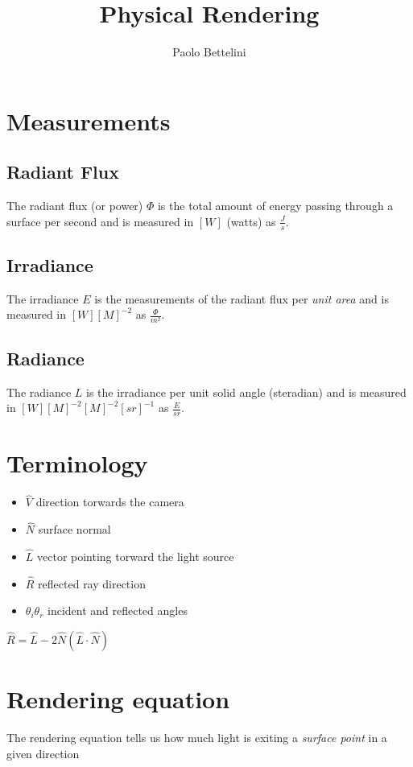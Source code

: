 \documentclass{article}
\title{Physical Rendering}
\author{Paolo Bettelini}
\date{}
\begin{document}
\maketitle
\tableofcontents
\pagebreak

\section{Measurements}

\subsection{Radiant Flux}

The radiant flux (or power) \(\Phi\) is the total amount of energy passing
through a surface per second and is measured in \([W]\) (watts) as \(\frac{J}{s}\).

\subsection{Irradiance}

The irradiance \(E\) is the measurements of the radiant flux per \textit{unit area}
and is measured in \([W]{[M]}^{-2}\) as \(\frac{\Phi}{m^2}\).

\subsection{Radiance}

The radiance \(L\) is the irradiance per unit solid angle (steradian) and is
measured in \([W]{[M]}^{-2}{[M]}^{-2}{[sr]}^{-1}\) as \(\frac{E}{sr}\).

\section{Terminology}


\begin{itemize}
    \item \(\hat{V}\) direction torwards the camera
    \item \(\hat{N}\) surface normal
    \item \(\hat{L}\) vector pointing torward the light source
    \item \(\hat{R}\) reflected ray direction
    \item \({\theta}_i {\theta}_r\) incident and reflected angles
\end{itemize}

\(\hat{R}=\hat{L}-2\hat{N}(\hat{L}\cdot\hat{N})\)


\pagebreak

\section{Rendering equation}

The rendering equation tells us how much light is exiting a \textit{surface point}
in a given direction

\end{document}
